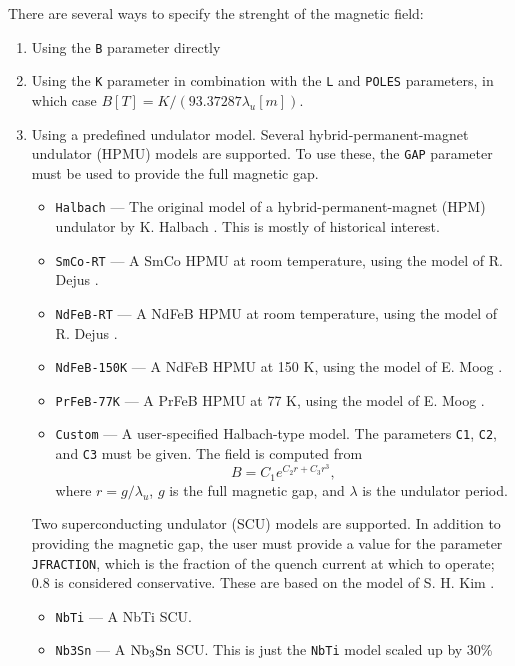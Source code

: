 There are several ways to specify the strenght of the magnetic field:
\begin{enumerate}
\item Using the \verb|B| parameter directly
\item Using the \verb|K| parameter in combination with the \verb|L| and \verb|POLES| parameters, in which case $B[T] = K/(93.37287 \lambda_u[m])$.
\item Using a predefined undulator model. Several hybrid-permanent-magnet undulator (HPMU) models are supported. To use these, the \verb|GAP| parameter
      must be used to provide the full magnetic gap.
      \begin{itemize}
        \item \verb|Halbach| --- The original model of a hybrid-permanent-magnet (HPM) undulator by K. Halbach \cite{HalbachModel}. This is mostly of historical interest.
        \item \verb|SmCo-RT| --- A SmCo HPMU at room temperature, using the model of R. Dejus \cite{DejusModels}.
        \item \verb|NdFeB-RT| --- A NdFeB HPMU at room temperature, using the model of R. Dejus \cite{DejusModels}.
        \item \verb|NdFeB-150K| --- A NdFeB HPMU at 150 K, using the model of E. Moog \cite{MoogModels}.
        \item \verb|PrFeB-77K| --- A PrFeB HPMU at 77 K, using the model of E. Moog \cite{MoogModels}.
        \item \verb|Custom| --- A user-specified Halbach-type model. The parameters \verb|C1|, \verb|C2|, and \verb|C3| must be given. The field is computed from
        \begin{equation}
                B = C_1 e^{C_2 r + C_3 r^3},
        \end{equation}
        where $r = g/\lambda_u$, $g$ is the full magnetic gap, and $\lambda$ is the undulator period.
      \end{itemize}
      Two superconducting undulator (SCU) models are supported. In addition to providing the magnetic gap, the user must
      provide a value for the parameter \verb|JFRACTION|, which is the fraction of the quench current at which to
      operate; 0.8 is considered conservative. These are based on the model of S. H. Kim \cite{Kim-SCU-Scaling}.
      \begin{itemize}
        \item \verb|NbTi| --- A NbTi SCU.
        \item \verb|Nb3Sn| --- A ${\rm Nb_3 Sn}$ SCU.  This is just the \verb|NbTi| model scaled up by 30\% \cite{IvanyushenkovPC}
      \end{itemize}
\end{enumerate}

